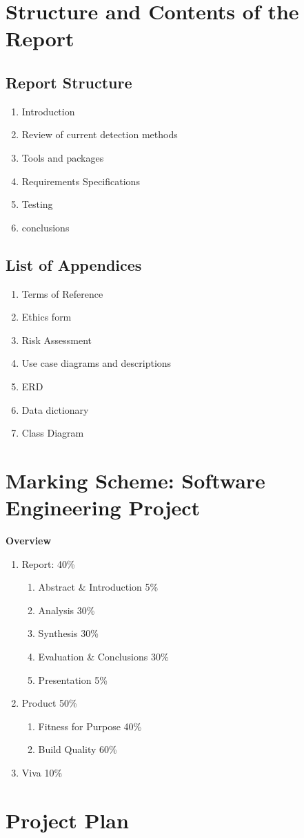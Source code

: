 \section{Structure and Contents of the Report}
\subsection{Report Structure}
\begin{enumerate} [topsep=0pt,itemsep=-0ex,partopsep=1ex,parsep=1pt,leftmargin=7ex,label=CH.\arabic*]
     \item Introduction
     \item Review of current detection methods
     \item Tools and packages 
     \item Requirements Specifications
     \item Testing
     \item conclusions
\end{enumerate}

\subsection{List of Appendices}
\begin{enumerate} [label=\Alph*)]
    \item Terms of Reference
    \item Ethics form
    \item Risk Assessment
    \item Use case diagrams and  descriptions
    \item ERD
    \item Data dictionary
    \item Class Diagram 
\end{enumerate}
\section{Marking Scheme: Software Engineering Project }
\textbf{Overview}

\begin{enumerate} [topsep=0pt,itemsep=-0ex,partopsep=1ex,parsep=1pt,label=]
    \item Report: 40\%
\begin{enumerate}[topsep=0pt,itemsep=-1ex,partopsep=1ex,parsep=1ex,label=]
\item Abstract \& Introduction 	5\%
\item Analysis 			30\%
\item Synthesis 			30\%
\item  Evaluation \& Conclusions 	30\%
\item Presentation 			5\%
\end{enumerate}
\item Product 50\%
\begin{enumerate}[topsep=0pt,itemsep=-1ex,partopsep=1ex,parsep=1ex,label=]
\item Fitness for Purpose 		40\%
\item Build Quality 			60\%
\end{enumerate}
\item Viva 10\%
\end{enumerate}

\clearpage

\section{Project Plan}
\noindent
{}
